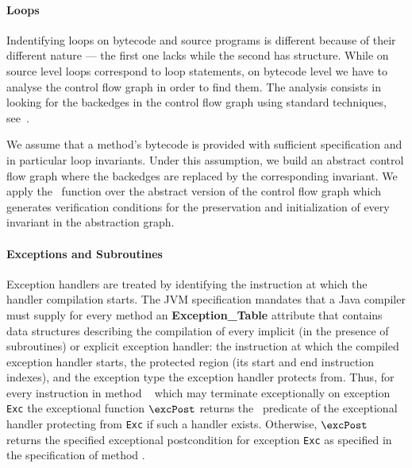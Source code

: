 \paragraph{Loops}
Indentifying loops on bytecode and source programs is different because of their different nature --- 
the first one lacks while the second has structure. While on source level loops correspond to loop statements,  
on bytecode level we have to analyse the control flow graph in order to find them.
 The analysis consists in looking for the backedges in the control flow graph using standard techniques, see~\cite{ARUCom1986}. 
  
 We assume that a method's bytecode is provided with sufficient specification and in particular loop invariants.
 Under this assumption, we build an abstract control flow graph where the backedges are replaced by
 the corresponding invariant. We apply the \wpi \ function over the abstract version of the control flow graph which generates verification conditions for the 
preservation and initialization of every invariant in the abstraction graph. 


     

\paragraph{Exceptions and Subroutines}
Exception handlers are treated by identifying the instruction at which the handler compilation starts. The JVM specification mandates 
that a Java compiler must supply for every method an \textbf{Exception\_Table} attribute that contains data structures describing the compilation of every implicit (in the presence of subroutines) or explicit exception handler: the instruction at which the compiled exception handler starts,
 the protected region (its start and end instruction indexes), and the exception type the exception handler protects from. Thus, 
for every instruction  in method \method~ which may terminate exceptionally on exception \texttt{Exc} the exceptional function
 $\excPost$  returns the \wpi \ predicate of the exceptional handler protecting  from \texttt{Exc} if such a handler exists.
Otherwise, $\excPost$ returns the specified exceptional postcondition for exception \texttt{Exc} as specified in the specification of
method \method.

